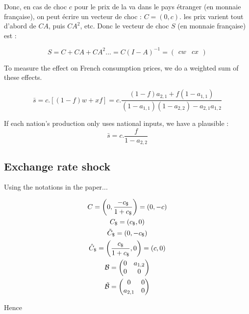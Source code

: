 \documentclass[11pt,a4paper]{article}
\begin{document}
Donc, en cas de choc $c$ pour le prix de la va dans le pays étranger (en monnaie française), on peut écrire un vecteur de choc : $C=\left(0,c\right)$.  les prix varient tout d'abord de  $CA$, puis $CA^2$, etc. Donc le vecteur de choc $S$ (en monnaie française) est : 


\begin{equation*}
S=C+CA+CA^2...=C(I-A)^{-1}=\left(\begin{matrix}cw  &   cx\end{matrix}\right)
\end{equation*}

To measure the effect on French consumption prices, we do a weighted sum of these effects.

\begin{equation}
\bar{s}=c.\left[\left(1-f\right)w+xf\right]=c.\frac{\left(1-f\right)a_{2,1}+f\left(1-a_{1,1}\right)}{\left(1-a_{1,1}\right)\left(1-a_{2,2}\right)-a_{2,1}a_{1,2}}
\end{equation}

If each nation's production only uses national inputs, we have a plausible :
\begin{equation*}
\bar{s}=c.\frac{f}{1-a_{2,2}}
\end{equation*}

\subsection{Exchange rate shock}

Using the notations in the paper...

\begin{gather*}
C=\left(0,\frac{-c_\$}{1+c_\$}\right)=\left(0,-c\right)
\\
C_\$=\left(c_\$,0\right)
\\
\tilde{C}_\$=\left(0,-c_\$\right)
\\
\hat{C}_\$=\left(\frac{c_\$}{1+c_\$},0\right)=\left(c,0\right)
\\
\cal B = \left(\begin{matrix}0&a_{1,2}\\0&0\end{matrix}\right)
\\
\tilde{\cal B} = \left(\begin{matrix}0&0\\a_{2,1}&0\end{matrix}\right)
\end{gather*}

Hence
\end{document}

